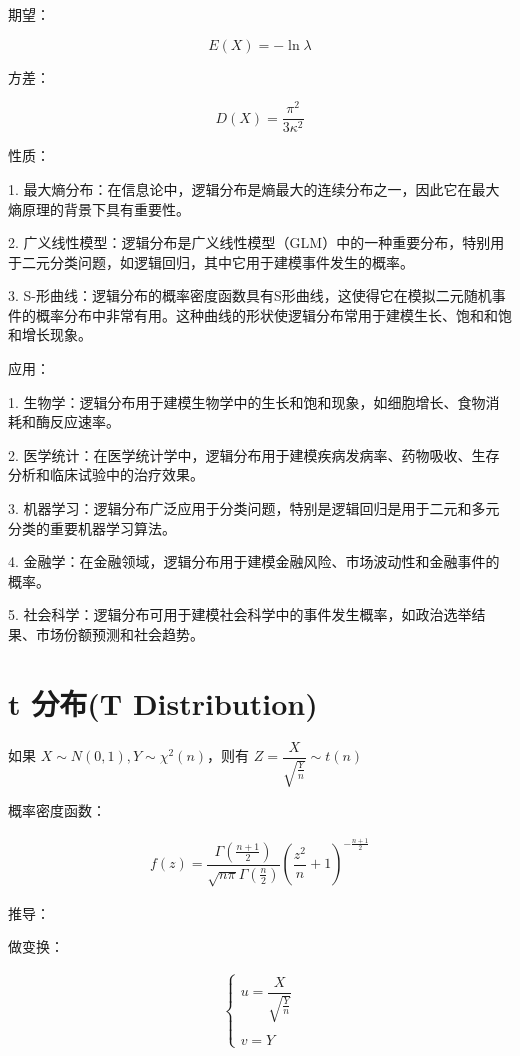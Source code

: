 \documentclass[12pt, a4paper, oneside]{ctexbook}
\begin{document}
 期望：

$$
E(X) = -\ln \lambda
$$

 方差：

$$
D(X) = \dfrac{\pi ^{2}}{3\kappa^{2}}
$$

 性质：

1. 最大熵分布：在信息论中，逻辑分布是熵最大的连续分布之一，因此它在最大熵原理的背景下具有重要性。

2. 广义线性模型：逻辑分布是广义线性模型（GLM）中的一种重要分布，特别用于二元分类问题，如逻辑回归，其中它用于建模事件发生的概率。

3. S-形曲线：逻辑分布的概率密度函数具有S形曲线，这使得它在模拟二元随机事件的概率分布中非常有用。这种曲线的形状使逻辑分布常用于建模生长、饱和和饱和增长现象。

 应用：

1. 生物学：逻辑分布用于建模生物学中的生长和饱和现象，如细胞增长、食物消耗和酶反应速率。

2. 医学统计：在医学统计学中，逻辑分布用于建模疾病发病率、药物吸收、生存分析和临床试验中的治疗效果。

3. 机器学习：逻辑分布广泛应用于分类问题，特别是逻辑回归是用于二元和多元分类的重要机器学习算法。

4. 金融学：在金融领域，逻辑分布用于建模金融风险、市场波动性和金融事件的概率。

5. 社会科学：逻辑分布可用于建模社会科学中的事件发生概率，如政治选举结果、市场份额预测和社会趋势。

\section{t 分布(T Distribution)}

如果 $X\sim N(0, 1), Y \sim \chi^{2}(n)$，则有 $Z = \dfrac{X}{\sqrt{\frac{Y}{n}}} \sim t(n)$

 概率密度函数：

$$
\begin{aligned}
f(z) =\dfrac{\Gamma(\frac{n + 1}{2})}{\sqrt{n\pi}\Gamma(\frac{n}{2})}\left(\dfrac{z^{2}}{n} + 1\right)^{-\frac{n + 1}{2}}
\end{aligned}
$$

 推导：

做变换：

$$
\begin{aligned}
\begin{cases}
u = \dfrac{X}{\sqrt{\frac{Y}{n}}} \\
\\
v = Y
\end{cases}
\end{aligned}
$$
\end{document}
